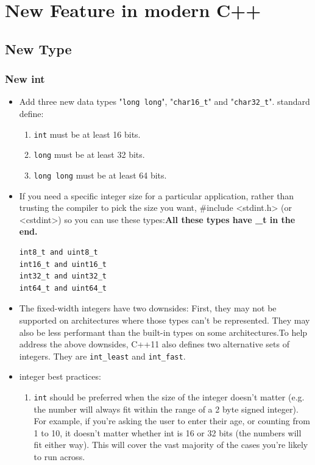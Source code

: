 \documentclass[a4paper,11pt,twoside]{book}
\begin{document}
\chapter{New Feature in modern C++}

\section{New Type}

\subsection{New int}

\begin{itemize}
\item Add three new data types "\texttt{long long}", "\texttt{char16\_t}"  and "\texttt{char32\_t}". standard define:
\begin{enumerate}
\item \texttt{int} must be at least 16 bits.
\item \texttt{long} must be at least 32 bits.
\item \texttt{long long} must be at least 64 bits.
\end{enumerate}

\item If you need a specific integer size for a particular application, rather than trusting the compiler to pick the size you want, \#include <stdint.h> (or <cstdint>) so you can use these types:\textbf{All these types have \_t in the end.}
\begin{lstlisting}[numbers=none]
int8_t and uint8_t
int16_t and uint16_t
int32_t and uint32_t
int64_t and uint64_t
\end{lstlisting}

\item The fixed-width integers have two downsides: First, they may not be supported on architectures where those types can't be represented. They may also be less performant than the built-in types on some architectures.To help address the above downsides, C++11 also defines two alternative sets of integers. They are \texttt{int\_least} and \texttt{int\_fast}.  


\item integer best practices:
\begin{enumerate}
	\item \texttt{int} should be preferred when the size of the integer doesn't matter (e.g. the number will always fit within the range of a 2 byte signed integer). For example, if you're asking the user to enter their age, or counting from 1 to 10, it doesn't matter whether int is 16 or 32 bits (the numbers will fit either way). This will cover the vast majority of the cases you're likely to run across.
	

\end{enumerate}
\end{itemize}
\end{document}

